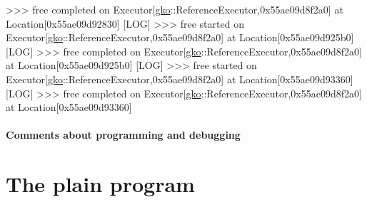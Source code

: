 \begin{DoxyCode}
[LOG] >>> free completed on Executor[\hyperlink{namespacegko}{gko}::ReferenceExecutor,0x55ae09d8f2a0] at Location[0x55ae09d92830]
[LOG] >>> free started on Executor[\hyperlink{namespacegko}{gko}::ReferenceExecutor,0x55ae09d8f2a0] at Location[0x55ae09d925b0]
[LOG] >>> free completed on Executor[\hyperlink{namespacegko}{gko}::ReferenceExecutor,0x55ae09d8f2a0] at Location[0x55ae09d925b0]
[LOG] >>> free started on Executor[\hyperlink{namespacegko}{gko}::ReferenceExecutor,0x55ae09d8f2a0] at Location[0x55ae09d93360]
[LOG] >>> free completed on Executor[\hyperlink{namespacegko}{gko}::ReferenceExecutor,0x55ae09d8f2a0] at Location[0x55ae09d93360]
\end{DoxyCode}


\label{_Commentsaboutprogramminganddebugging}%
\paragraph*{Comments about programming and debugging }

\label{_PlainProg}%
 \section*{The plain program}


